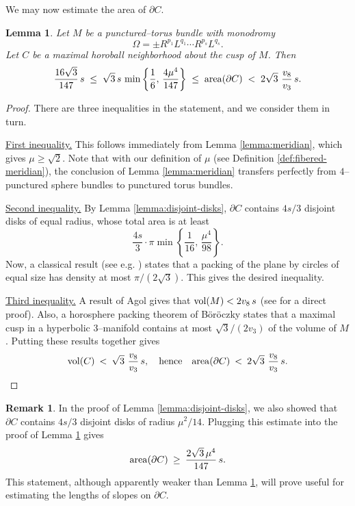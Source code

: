 \documentclass[11pt]{amsart}
\newcommand{\vol}{{\rm vol}}
\newcommand{\area}{{\rm area}}
\newcommand{\bdy}{{\partial}}
\theoremstyle{plain}
\newtheorem{lemma}[theorem]{Lemma}
\theoremstyle{definition}
\newtheorem*{remark}{Remark}
\begin{document}
We may now estimate the area of $\bdy C$.

\begin{lemma}\label{lemma:cusp-area-mu}
Let $M$ be a punctured--torus bundle with monodromy
$$\Omega = \pm R^{p_1}L^{q_1} \cdots R^{p_s}L^{q_s}.$$
%
Let $C$ be a maximal horoball neighborhood about the cusp of $M$.
Then
$$\frac{16 \sqrt{3}}{147} \, s \; \leq \; \sqrt{3}\, s \, \min\left\{
\frac{1}{6}, \, \frac{4 \mu^4}{147} \right\} \; \leq \; \area(\bdy C)
\;<\; 2 \sqrt{3} \,\, \frac{v_8}{v_3} \, s.$$
\end{lemma}

\begin{proof}
There are three inequalities in the statement, and we consider them in
turn.

\smallskip
\underline{First inequality.}  This follows immediately from Lemma
\ref{lemma:meridian}, which gives $\mu \geq \sqrt{2}$.  Note that with
our definition of $\mu$ (see Definition \ref{def:fibered-meridian}),
the conclusion of Lemma \ref{lemma:meridian} transfers perfectly from
$4$--punctured sphere bundles to punctured torus bundles.

\smallskip
\underline{Second inequality.}  By Lemma \ref{lemma:disjoint-disks},
$\bdy C$ contains $4s/3$ disjoint disks of equal radius, whose total
area is at least
$$ \frac{4s}{3} \cdot \pi \min\left\{\frac{1}{16}, \, \frac{\mu^4}{98}
\right\}.$$
%
Now, a classical result (see e.g. \cite[Theorem 1]{boroczky}) states
that a packing of the plane by circles of equal size has density at
most $\pi/(2 \sqrt{3})$.  This gives the desired inequality.

\smallskip
\underline{Third inequality.}  A result of Agol gives that $\vol(M) <
2v_8 \, s$ (see \cite[Theorem B.1]{gf:two-bridge} for a direct proof).
Also, a horosphere packing theorem of B{\"o}r{\"o}czky \cite[Theorem
4]{boroczky} states that a maximal cusp in a hyperbolic $3$--manifold
contains at most $\sqrt{3}/(2v_3)$ of the volume of $M$.  Putting
these results together gives
$$  \vol(C) \:<\: \sqrt{3} \,\, \frac{v_8}{v_3} \, s, \quad
\mbox{hence} \quad 
\area(\bdy C) \:<\: 2 \sqrt{3} \,\, \frac{v_8}{v_3} \, s.$$

\vspace{-3ex}
\end{proof}

\begin{remark}
In the proof of Lemma \ref{lemma:disjoint-disks}, we also showed that
$\bdy C$ contains $4s/3$ disjoint disks of radius $\mu^2/14$.
Plugging this estimate into the proof of Lemma
\ref{lemma:cusp-area-mu} gives
$$ \area(\bdy C) \: \geq  \: \frac{2 \sqrt{3} \, \mu^4}{147} \, s.$$
%
This statement, although apparently weaker than Lemma
\ref{lemma:cusp-area-mu}, will prove useful for estimating the lengths
of slopes on $\bdy C$.
\end{remark}
\end{document}
